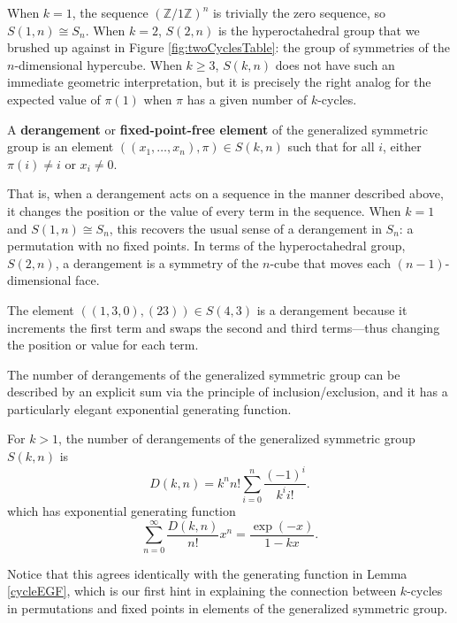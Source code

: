 When $k = 1$, the sequence $(\mathbb{Z}/1\mathbb{Z})^n$ is trivially the zero
sequence, so $S(1,n) \cong S_n$.
When $k = 2$, $S(2,n)$ is the hyperoctahedral group that we brushed up against
in Figure \ref{fig:twoCyclesTable}:
the group of symmetries of the $n$-dimensional hypercube.
When $k \geq 3$, $S(k,n)$ does not have such an immediate geometric interpretation,
but it is precisely the right analog for the expected value of $\pi(1)$ when
$\pi$ has a given number of $k$-cycles.

\begin{definition}
  A \textbf{derangement} or \textbf{fixed-point-free element}
  of the generalized symmetric group is an element
  $((x_1,\dots,x_n),\pi) \in S(k,n)$ such that for all $i$,
  either $\pi(i) \neq i$ or $x_i \neq 0$.
\end{definition}

That is, when a derangement acts on a sequence in the manner described above,
it changes the position or the value of every term in the sequence.
When $k = 1$ and $S(1,n) \cong S_n$, this recovers the usual sense of a
derangement in $S_n$: a permutation with no fixed points.
In terms of the hyperoctahedral group, $S(2,n)$, a derangement is a symmetry of
the $n$-cube that moves each $(n-1)$-dimensional face.

\begin{example}
  The element $((1,3,0), (23)) \in S(4,3)$ is a derangement because it
  increments the first term and swaps the second and third terms---thus
  changing the position or value for each term.
\end{example}

The number of derangements of the generalized symmetric group can be described
by an explicit sum via the principle of inclusion/exclusion, and it has a
particularly elegant exponential generating function.

\begin{theorem} %
  \label{derangementEGF}
  For $k > 1$, the number of derangements of the generalized symmetric group $S(k,n)$ is
  \begin{equation}
    D(k,n) = k^n n!\sum_{i=0}^n \frac{(-1)^i}{k^i i!}.
  \end{equation} which has exponential generating function
  \begin{equation}
    \sum_{n=0}^\infty \frac{D(k,n)}{n!}x^n = \frac{\exp(-x)}{1 - kx}.
  \end{equation}
\end{theorem}
Notice that this agrees identically with the generating function in
Lemma \ref{cycleEGF}, which is our first hint in explaining the connection
between $k$-cycles in permutations and fixed points in elements of the
generalized symmetric group.
